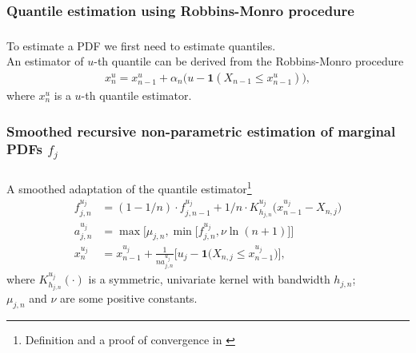 \documentclass[aspectratio=169]{beamer}
\begin{document}
		\subsubsection{Quantile estimation using Robbins-Monro procedure}
			\begin{frame}
				\frametitle{\insertsubsubsection}
				
				To estimate a PDF we first need to estimate quantiles.
				\\[1em]
				
				
				\onslide<2-> An estimator of $ u $-th quantile can be derived from the Robbins-Monro procedure
				\begin{align}
					x^u_n = x^u_{n-1} + \alpha_n\big(u - \mathbf{1}(X_{n-1}\leq x^u_{n-1})\big),
				\end{align}
				where $ x^u_n $ is a $ u $-th quantile estimator.
				
			\end{frame}
			
			
		\subsubsection{Smoothed recursive non-parametric estimation of marginal PDFs $ f_j $}
			\begin{frame}
				\frametitle{\insertsubsubsection}
				
				A smoothed adaptation of the quantile estimator\footnote{Definition and a proof of convergence in \textcite{Amiri2014}}
				\begin{align}
					f^{u_j}_{j, n} &= (1- 1/n) \cdot f^{u_j}_{j, n-1} + 1/n \cdot K^{u_j}_{h_{j, n}}\big(x^{u_j}_{n-1} - X_{n, j}\big) \\
					a^{u_j}_{j, n} &= \max\Big[\mu_{j, n}, \min\big[f^{u_j}_{j, n}, \nu \ln(n+1)\big]\Big] \\
					x^{u_j}_n &= x^{u_j}_{n-1} + \frac{1}{n a^{u_j}_{j, n}}\Big[u_j - \mathbf{1}\big(X_{n, j}\leq x^{u_j}_{n-1}\big)\Big],
				\end{align}
				where $ K_{h_{j, n}}^{u_j}(\cdot) $ is a symmetric, univariate kernel with bandwidth $ h_{j,n} $;\\ $ \mu_{j, n} $ and $ \nu $ are some positive constants.
				
			\end{frame}			
			
\end{document}
